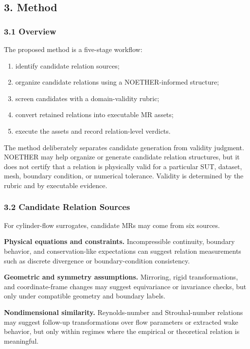 \subsection{3. Method}\label{method-1}

\subsubsection{3.1 Overview}\label{overview}

The proposed method is a five-stage workflow:

\begin{enumerate}
\def\labelenumi{\arabic{enumi}.}
\tightlist
\item
  identify candidate relation sources;
\item
  organize candidate relations using a NOETHER-informed structure;
\item
  screen candidates with a domain-validity rubric;
\item
  convert retained relations into executable MR assets;
\item
  execute the assets and record relation-level verdicts.
\end{enumerate}

The method deliberately separates candidate generation from validity
judgment. NOETHER may help organize or generate candidate relation
structures, but it does not certify that a relation is physically valid
for a particular SUT, dataset, mesh, boundary condition, or numerical
tolerance. Validity is determined by the rubric and by executable
evidence.

\subsubsection{3.2 Candidate Relation
Sources}\label{candidate-relation-sources}

For cylinder-flow surrogates, candidate MRs may come from six sources.

\textbf{Physical equations and constraints.} Incompressible continuity,
boundary behavior, and conservation-like expectations can suggest
relation measurements such as discrete divergence or boundary-condition
consistency.

\textbf{Geometric and symmetry assumptions.} Mirroring, rigid
transformations, and coordinate-frame changes may suggest equivariance
or invariance checks, but only under compatible geometry and boundary
labels.

\textbf{Nondimensional similarity.} Reynolds-number and Strouhal-number
relations may suggest follow-up transformations over flow parameters or
extracted wake behavior, but only within regimes where the empirical or
theoretical relation is meaningful.

